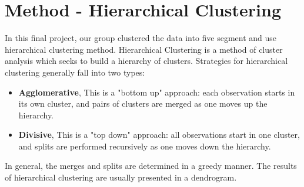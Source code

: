 \section{Method - Hierarchical Clustering}
In this final project, our group clustered the data into five segment and use hierarchical clustering method. Hierarchical Clustering is a method of cluster analysis which seeks to build a hierarchy of clusters. Strategies for hierarchical clustering generally fall into two types:
\begin{itemize}
	\item \textbf{Agglomerative}, This is a "bottom up" approach: each observation starts in its own cluster, and pairs of clusters are merged as one moves up the hierarchy.
	\item \textbf{Divisive}, This is a "top down" approach: all observations start in one cluster, and splits are performed recursively as one moves down the hierarchy.
\end{itemize}

In general, the merges and splits are determined in a greedy manner. The results of hierarchical clustering are usually presented in a dendrogram.
